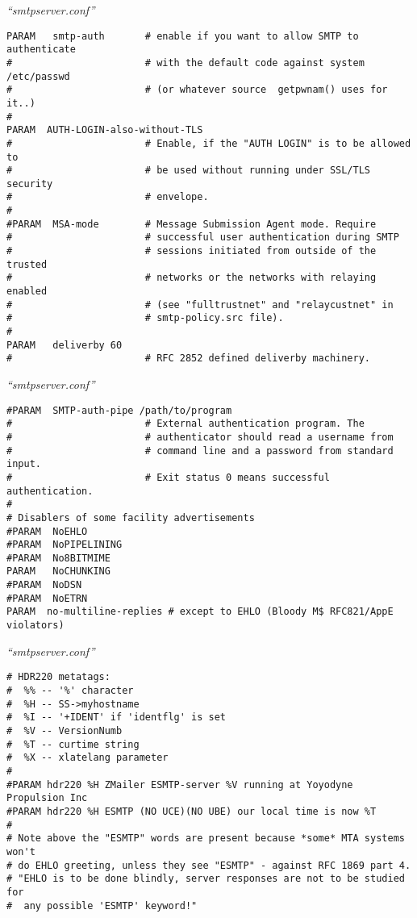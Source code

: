 \documentclass[a4paper,landscape]{slides}
\begin{document}
\begin{overlay}
\small
\centerline{{\em ``smtpserver.conf''}}
\tiny
\begin{verbatim}
PARAM   smtp-auth       # enable if you want to allow SMTP to authenticate
#                       # with the default code against system  /etc/passwd
#                       # (or whatever source  getpwnam() uses for it..)
#
PARAM  AUTH-LOGIN-also-without-TLS
#                       # Enable, if the "AUTH LOGIN" is to be allowed to
#                       # be used without running under SSL/TLS security
#                       # envelope.
#
#PARAM  MSA-mode        # Message Submission Agent mode. Require
#                       # successful user authentication during SMTP
#                       # sessions initiated from outside of the trusted
#                       # networks or the networks with relaying enabled
#                       # (see "fulltrustnet" and "relaycustnet" in
#                       # smtp-policy.src file).
#
PARAM   deliverby 60
#                       # RFC 2852 defined deliverby machinery.
\end{verbatim}
\vfill
\end{overlay}
\begin{overlay}
\small
\centerline{{\em ``smtpserver.conf''}}
\tiny
\begin{verbatim}
#PARAM  SMTP-auth-pipe /path/to/program
#                       # External authentication program. The
#                       # authenticator should read a username from
#                       # command line and a password from standard input.
#                       # Exit status 0 means successful authentication.
#
# Disablers of some facility advertisements
#PARAM  NoEHLO
#PARAM  NoPIPELINING
#PARAM  No8BITMIME
PARAM   NoCHUNKING
#PARAM  NoDSN
#PARAM  NoETRN
PARAM  no-multiline-replies # except to EHLO (Bloody M$ RFC821/AppE violators)
\end{verbatim}
\vfill
\end{overlay}
\begin{overlay}
\small
\centerline{{\em ``smtpserver.conf''}}
\tiny
\begin{verbatim}
# HDR220 metatags:
#  %% -- '%' character
#  %H -- SS->myhostname
#  %I -- '+IDENT' if 'identflg' is set
#  %V -- VersionNumb
#  %T -- curtime string
#  %X -- xlatelang parameter
#
#PARAM hdr220 %H ZMailer ESMTP-server %V running at Yoyodyne Propulsion Inc
#PARAM hdr220 %H ESMTP (NO UCE)(NO UBE) our local time is now %T
#
# Note above the "ESMTP" words are present because *some* MTA systems won't
# do EHLO greeting, unless they see "ESMTP" - against RFC 1869 part 4.
# "EHLO is to be done blindly, server responses are not to be studied for
#  any possible 'ESMTP' keyword!"
\end{verbatim}
\vfill
\end{overlay}
\end{document}
